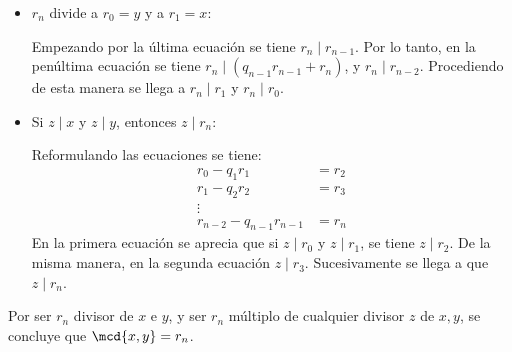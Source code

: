 \begin{dem}{\cite[p.~51]{GamboaAnillos}}
\begin{itemize}[label=--]
    \item $r_n$ divide a $r_0 = y$ y a $r_1 = x$:
    
    Empezando por la última ecuación se tiene $r_n \mid r_{n-1}$. Por lo tanto, en la penúltima ecuación se tiene $r_n\mid (q_{n-1}r_{n-1} + r_n)$, y $r_n\mid r_{n-2}$. Procediendo de esta manera se llega a $r_n \mid r_1$ y $r_n \mid r_0$.
    \item Si $z\mid x$ y $z\mid y$, entonces $z\mid r_n$:

    Reformulando las ecuaciones se tiene:\vspace{-0.3em}
    \begin{equation}
        \begin{aligned}
            r_0 - q_1r_1 \quad&=  r_2\\
            r_1 - q_2r_2\quad &=  r_3 \\
            \vdots\quad\quad\\
            r_{n-2}- q_{n-1}r_{n-1} &=  r_n
        \end{aligned}
    \tag{*}
    \label{ecEuclides_restos}
    \end{equation}
        En la primera ecuación se aprecia que si $z\mid r_0$ y $z\mid r_1$, se tiene $z\mid r_2$. De la misma manera, en la segunda ecuación $z\mid r_3$. Sucesivamente se llega a que $z\mid r_n$.
\end{itemize}
    \item Por ser $r_n$ divisor de $x$ e $y$, y ser $r_n$ múltiplo de cualquier divisor $z$ de $x,y$, se concluye que $\mcd{x,y} = r_n$.        
\end{dem}

\begin{prop}\end{prop}

